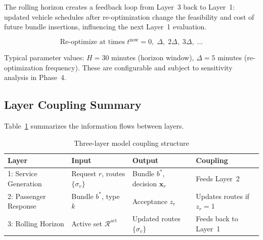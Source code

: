 The rolling horizon creates a feedback loop from Layer~3 back to Layer~1: updated vehicle
schedules after re-optimization change the feasibility and cost of future bundle insertions,
influencing the next Layer~1 evaluation.

\begin{equation}\label{eq:rh-trigger}
  \text{Re-optimize at times } t^{\text{now}} = 0,\; \Delta,\; 2\Delta,\; 3\Delta,\; \ldots
\end{equation}

Typical parameter values: $H = 30$ minutes (horizon window), $\Delta = 5$ minutes
(re-optimization frequency). These are configurable and subject to sensitivity analysis
in Phase~4.

\subsection{Layer Coupling Summary}

Table~\ref{tab:layer-coupling} summarizes the information flows between layers.

\begin{table}[h]
\centering
\caption{Three-layer model coupling structure}
\label{tab:layer-coupling}
\begin{tabular}{llll}
\toprule
Layer & Input & Output & Coupling \\
\midrule
1: Service Generation & Request $r$, routes $\{\sigma_v\}$ & Bundle $b^*$, decision $\mathbf{x}_r$ & Feeds Layer~2 \\
2: Passenger Response & Bundle $b^*$, type $k$ & Acceptance $z_r$ & Updates routes if $z_r=1$ \\
3: Rolling Horizon & Active set $\mathcal{R}^{\text{act}}$ & Updated routes $\{\sigma_v\}$ & Feeds back to Layer~1 \\
\bottomrule
\end{tabular}
\end{table}

